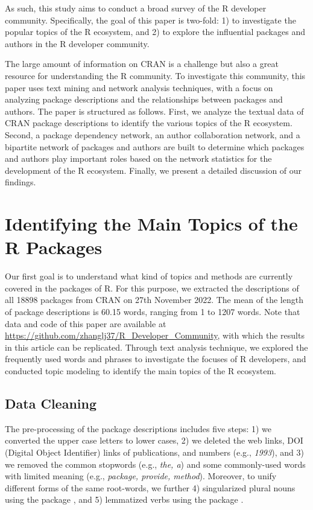 As such, this study aims to conduct a broad survey of the R developer community. Specifically, the goal of this paper is two-fold: 1) to investigate the popular topics of the R ecosystem, and 2) to explore the influential packages and authors in the R developer community.


The large amount of information on CRAN is a challenge but also a great resource for understanding the R community. To investigate this community, this paper uses text mining and network analysis techniques, with a focus on analyzing package descriptions and the relationships between packages and authors. The paper is structured as follows. First, we  analyze the textual data of CRAN package descriptions to identify the various topics of the R ecosystem. Second, a package dependency network, an author collaboration network, and a bipartite network of packages and authors are built to determine which packages and authors play important roles based on the network statistics for the development of the R ecosystem. Finally, we present a detailed discussion of our findings.




\section{Identifying the Main Topics of the R Packages}


Our first goal is to understand what kind of topics and methods are currently covered in the packages of R. For this purpose, we extracted the descriptions of all 18898 packages from CRAN on 27th November 2022. The mean of the length of package descriptions is 60.15 words, ranging from 1 to 1207 words. Note that data and code of this paper are available at \url{https://github.com/zhanglj37/R_Developer_Community}, with which the results in this article can be replicated. Through text analysis technique, we explored the frequently used words and phrases to investigate the focuses of R developers, and conducted topic modeling to identify the main topics of the R ecosystem.


\subsection{Data Cleaning}

The pre-processing of the package descriptions includes five steps: 1) we converted the upper case letters to lower cases, 2) we deleted the web links, DOI (Digital Object Identifier) links of publications, and numbers (e.g., {\it 1993}), and 3) we removed the common stopwords (e.g., {\it the, a}) and some commonly-used words with limited meaning (e.g., {\it package, provide, method}). Moreover, to unify different forms of the same root-words, we further 4) singularized plural nouns using the  package \citep{christensen2019semna}, and 5) lemmatized verbs using the  package \citep{spacyr}.


